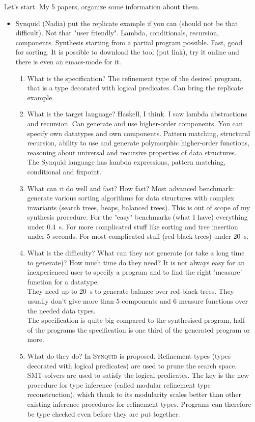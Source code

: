 Let's start. My 5 papers, organize some information about them.
\begin{itemize}
\item Synquid (Nadia) put the replicate example if you can (should not be that difficult). Not that "user friendly". Lambda, conditionals, recursion, components. Synthesis starting from a partial program possible. Fast, good for sorting. It is possible to download the tool (put link), try it online and there is even an emacs-mode for it.
\begin{enumerate}
\item What is the specification?
The refinement type of the desired program, that is a type decorated with logical predicates. Can bring the replicate example.
\item What is the target language?
Haskell, I think. I saw lambda abstractions and recursion. Can generate and use higher-order components. You can specify own datatypes and own components.
Pattern matching, structural recursion, ability to use and generate polymorphic higher-order functions, reasoning about universal and recursive properties of data structures.\\
The Synquid language has lambda expressions, pattern matching, conditional and fixpoint.
\item What can it do well and fast? How fast?
Most advanced benchmark: generate various sorting algorithms for data structures with complex invariants (search trees, heaps, balanced trees). This is out of scope of my synthesis procedure.
For the "easy" benchmarks (what I have) everything under 0.4~s. For more complicated stuff like sorting and tree insertion under 5 seconds. For most complicated stuff (red-black trees) under 20~s.
\item What is the difficulty? What can they not generate (or take a long time to generate)? How much time do they need?
It is not always easy for an inexperienced user to specify a program and to find the right 'measure' function for a datatype.\\
They need up to 20~s to generate balance over red-black trees. They usually don't give more than 5 components and 6 measure functions over the needed data types.\\
The specification is quite big compared to the synthesised program, half of the programs the specification is one third of the generated program or more.
\item What do they do?
In \cite{SynquidPaper} \textsc{Synquid} is proposed.
Refinement types (types decorated with logical predicates) are used to prune the search space. SMT-solvers are used to satisfy the logical predicates. The key is the new procedure for type inference (called modular refinement type reconstruction), which thank to its modularity scales better than other existing inference procedures for refinement types. Programs can therefore be type checked even before they are put together.

\end{enumerate}
\end{itemize}
